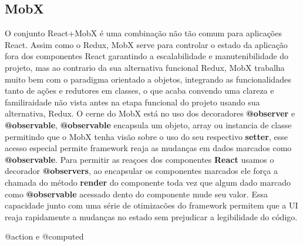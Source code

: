 \documentclass[rel_mlp]{iiufrgs}
\begin{document}
\subsection{MobX}
O conjunto React+MobX é uma combinação não tão comum para aplicações React. Assim como o Redux, MobX serve para controlar o estado da aplicação fora dos componentes React garantindo a escalabilidade e manutenibilidade
 do projeto, mas ao contrario da sua alternativa funcional Redux, MobX trabalha muito bem com o paradigma orientado a objetos, integrando as funcionalidades tanto de ações e redutores em classes, o que acaba convendo uma clareza
 e familiraidade não vista antes na etapa funcional do projeto usando sua alternativa, Redux. O cerne do MobX está no uso dos decoradores \textbf{@observer} e \textbf{@observable}, \textbf{@observable} encapsula um objeto, array ou instancia de classe
  permitindo que o MobX tenha visão sobre o uso do seu respectivo \textbf{setter}, esse acesso especial permite framework reaja as mudanças em dados marcados como \textbf{@observable}. Para permitir as reaçoes dos componentes \textbf{React}
   usamos o decorador \textbf{@observers}, ao encapsular os componentes marcados ele força a chamada do método \textbf{render} do componente toda vez que algum dado marcado como \textbf{@observable} acessado dento do componente mude seu valor.
    Essa capacidade junto com uma série de otimizacões do framework permitem que a UI reaja rapidamente a mudanças no estado sem prejudicar a legibilidade do código.

    \par {@action e @computed}
\end{document}
